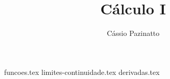\documentclass[xcolor=table]{beamer}
\author{Cássio Pazinatto}
\title{Cálculo I}
\begin{document}
  {funcoes.tex}
  {limites-continuidade.tex}
  {derivadas.tex}
\end{document}
